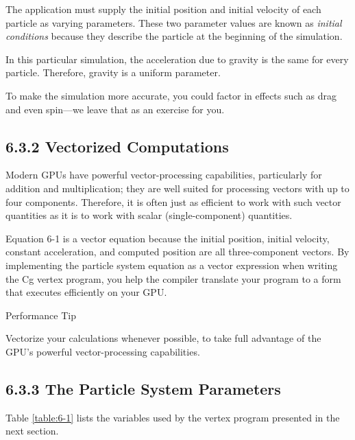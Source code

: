 \documentclass[../main.tex]{subfiles}
\begin{document}
The application must supply the initial position and initial velocity of each particle as varying parameters. These two parameter values are known as \textit{initial conditions} because they describe the particle at the beginning of the simulation.

In this particular simulation, the acceleration due to gravity is the same for every particle. Therefore, gravity is a uniform parameter.

To make the simulation more accurate, you could factor in effects such as drag and even spin—we leave that as an exercise for you.

\subsection{6.3.2 Vectorized Computations}

Modern GPUs have powerful vector-processing capabilities, particularly for addition and multiplication; they are well suited for processing vectors with up to four components. Therefore, it is often just as efficient to work with such vector quantities as it is to work with scalar (single-component) quantities.

Equation 6-1 is a vector equation because the initial position, initial velocity, constant acceleration, and computed position are all three-component vectors. By implementing the particle system equation as a vector expression when writing the Cg vertex program, you help the compiler translate your program to a form that executes efficiently on your GPU.

\begin{framed}
Performance Tip

Vectorize your calculations whenever possible, to take full advantage of the GPU's powerful vector-processing capabilities.
\end{framed}

\subsection{6.3.3 The Particle System Parameters}

Table \ref{table:6-1} lists the variables used by the vertex program presented in the next section.
\end{document}
